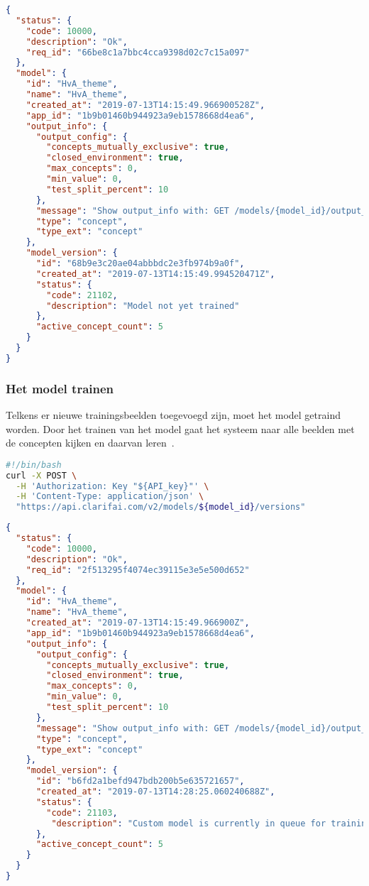 \begin{lstlisting}[language=json,caption=antwoord van de API na het creëren van het model]
{
  "status": {
    "code": 10000,
    "description": "Ok",
    "req_id": "66be8c1a7bbc4cca9398d02c7c15a097"
  },
  "model": {
    "id": "HvA_theme",
    "name": "HvA_theme",
    "created_at": "2019-07-13T14:15:49.966900528Z",
    "app_id": "1b9b01460b944923a9eb1578668d4ea6",
    "output_info": {
      "output_config": {
        "concepts_mutually_exclusive": true,
        "closed_environment": true,
        "max_concepts": 0,
        "min_value": 0,
        "test_split_percent": 10
      },
      "message": "Show output_info with: GET /models/{model_id}/output_info",
      "type": "concept",
      "type_ext": "concept"
    },
    "model_version": {
      "id": "68b9e3c20ae04abbbdc2e3fb974b9a0f",
      "created_at": "2019-07-13T14:15:49.994520471Z",
      "status": {
        "code": 21102,
        "description": "Model not yet trained"
      },
      "active_concept_count": 5
    }
  }
}
\end{lstlisting}


\subsubsection{Het model trainen}
\label{subsubsec:model-trainen}

Telkens er nieuwe trainingsbeelden toegevoegd zijn, moet het model getraind worden. Door het trainen van het model gaat het systeem naar alle beelden met de concepten kijken en daarvan leren~\autocite{ClarifaiAPI}. 


\begin{lstlisting}[language=bash,caption=bash commando om het model te trainen]
#!/bin/bash
curl -X POST \
  -H 'Authorization: Key "${API_key}"' \
  -H 'Content-Type: application/json' \
  "https://api.clarifai.com/v2/models/${model_id}/versions" 
\end{lstlisting}

\begin{lstlisting}[language=json,caption=antwoord van de API nadat het model getraind werd]
{
  "status": {
    "code": 10000,
    "description": "Ok",
    "req_id": "2f513295f4074ec39115e3e5e500d652"
  },
  "model": {
    "id": "HvA_theme",
    "name": "HvA_theme",
    "created_at": "2019-07-13T14:15:49.966900Z",
    "app_id": "1b9b01460b944923a9eb1578668d4ea6",
    "output_info": {
      "output_config": {
        "concepts_mutually_exclusive": true,
        "closed_environment": true,
        "max_concepts": 0,
        "min_value": 0,
        "test_split_percent": 10
      },
      "message": "Show output_info with: GET /models/{model_id}/output_info",
      "type": "concept",
      "type_ext": "concept"
    },
    "model_version": {
      "id": "b6fd2a1befd947bdb200b5e635721657",
      "created_at": "2019-07-13T14:28:25.060240688Z",
      "status": {
        "code": 21103,
         "description": "Custom model is currently in queue for training, waiting on inputs to process."
      },
      "active_concept_count": 5
    }
  }
}
\end{lstlisting}

